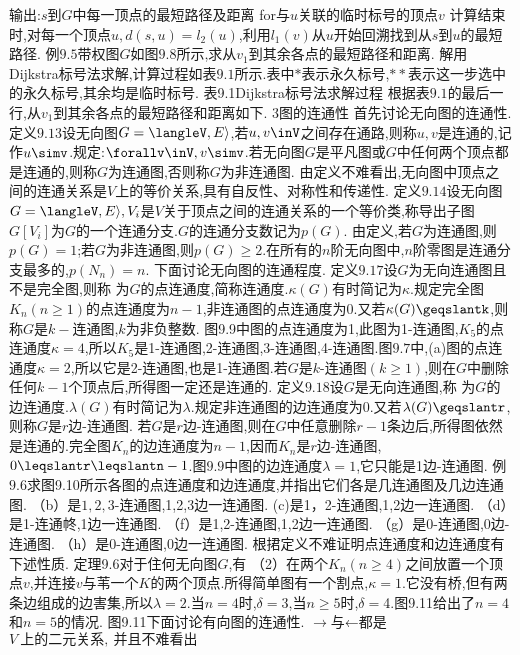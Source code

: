 输出:$s$到$G$中每一顶点的最短路径及距离
for与$u$关联的临时标号的顶点$v$
计算结束时,对每一个顶点$u,d(s,u)=l_{2}(u)$,利用$l_{1}(v)$从$u$开始回溯找到从$s$到$u$的最短路径.
例$9.5$带权图$G$如图$9.8$所示,求从$v_{1}$到其余各点的最短路径和距离.
解用Dijkstra标号法求解,计算过程如表$9.1$所示.表中$*$表示永久标号,$**$表示这一步选中的永久标号,其余均是临时标号.
表9.1Dijkstra标号法求解过程
根据表$9.1$的最后一行,从$v_{1}$到其余各点的最短路径和距离如下.
{3图的连通性}
首先讨论无向图的连通性.
定义$9.13$设无向图$G=\langleV,E\rangle$,若$u,v\inV$之间存在通路,则称$u,v$是连通的,记作$u\simv$.规定:$\forallv\inV,v\simv$.若无向图$G$是平凡图或$G$中任何两个顶点都是连通的,则称$G$为连通图,否则称$G$为非连通图.
由定义不难看出,无向图中顶点之间的连通关系是$V$上的等价关系,具有自反性、对称性和传递性.
定义$9.14$设无向图$G=\langleV,E\rangle,V_{i}$是$V$关于顶点之间的连通关系的一个等价类,称导出子图$G\left[V_{i}\right]$为$G$的一个连通分支.$G$的连通分支数记为$p(G)$.
由定义,若$G$为连通图,则$p(G)=1$;若$G$为非连通图,则$p(G)\geqslant2$.在所有的$n$阶无向图中,$n$阶零图是连通分支最多的,$p\left(N_{n}\right)=n$.
下面讨论无向图的连通程度.
定义$9.17$设$G$为无向连通图且不是完全图,则称
为$G$的点连通度,简称连通度.$\kappa(G)$有时简记为$\kappa$.规定完全图$K_{n}(n\geqslant1)$的点连通度为$n-1$,非连通图的点连通度为0.又若$\kappa(G)\geqslantk$,则称$G$是$k-$连通图,$k$为非负整数.
图9.9中图的点连通度为1,此图为1-连通图,$K_{5}$的点连通度$\kappa=4$,所以$K_{5}$是1-连通图,2-连通图,3-连通图,4-连通图.图$9.7$中,(a)图的点连通度$\kappa=2$,所以它是2-连通图,也是1-连通图.若$G$是$k$-连通图$(k\geqslant1)$,则在$G$中删除任何$k-1$个顶点后,所得图一定还是连通的.
定义$9.18$设$G$是无向连通图,称
为$G$的边连通度.$\lambda(G)$有时简记为$\lambda$.规定非连通图的边连通度为0.又若$\lambda(G)\geqslantr$,则称$G$是$r$边-连通图.
若$G$是$r$边-连通图,则在$G$中任意删除$r-1$条边后,所得图依然是连通的.完全图$K_{n}$的边连通度为$n-1$,因而$K_{n}$是$r$边-连通图,$0\leqslantr\leqslantn-1$.图$9.9$中图的边连通度$\lambda=1$,它只能是1边-连通图.
例$9.6$求图9.10所示各图的点连通度和边连通度,并指出它们各是几连通图及几边连通图.
（b）是$1,2,3$-连通图,1,2,3边一连通图.
(c)是1，2-连通图,1,2边一连通图.
（d）是1-连通㠽,1边一连通图.
（f）是1,2-连通图,1,2边一连通图.
（g）是0-连通图,0边-连通图.
（h）是0-连通图,0边一连通图.
根捃定义不难证明点连通度和边连通度有下述性质.
定理9.6对于住何无向图$G$,有
（2）在两个$K_{n}(n\geqslant4)$之间放置一个顶点$v$,并连接$v$与苇一个$K$的两个顶点.所得简单图有一个割点,$\kappa=1$.它没有桥,但有两条边组成的边害集,所以$\lambda=2.$当$n=4$时,$\delta=3$,当$n\geqslant5$时,$\delta=$4.图9.11给出了$n=4$和$n=5$的情况.
图9.11下面讨论有向图的连通性.
$\rightarrow$与←都是$V\mathrm{~上的二元关系,~并且不难看出}$
